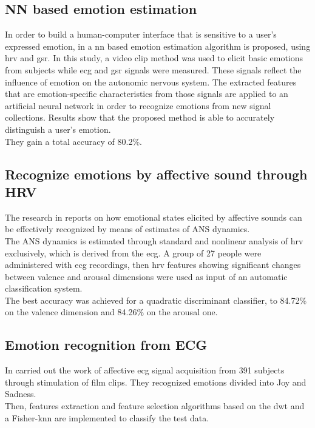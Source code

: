 \subsection{NN based emotion estimation}
In order to build a human-computer interface that is sensitive to a user's expressed emotion, in \cite{yoo2005neural} a \gls{nn} based emotion estimation algorithm is proposed, using \gls{hrv} and \gls{gsr}. In this study, a video clip method was used to elicit basic emotions from subjects while \gls{ecg} and \gls{gsr} signals were measured. These signals reflect the influence of emotion on the autonomic nervous system. The extracted features that are emotion-specific characteristics from those signals are applied to an artificial neural network in order to recognize emotions from new signal collections. Results show that the proposed method is able to accurately distinguish a user's emotion.
\\ They gain a total accuracy of 80.2\%.

\subsection{Recognize emotions by affective sound through HRV}
The research in \cite{nardelli2015recognizing} reports on how emotional states elicited by affective sounds can be effectively recognized by means of estimates of ANS dynamics.
\\ \indent
The ANS dynamics is estimated through standard and nonlinear analysis of \gls{hrv} exclusively, which is derived from the \gls{ecg}. A group of 27 people were administered with \gls{ecg} recordings, then \gls{hrv} features showing significant changes between valence and arousal dimensions were used as input of an automatic classification system.
\\ \indent
The best accuracy was achieved for a quadratic discriminant classifier, to 84.72\% on the valence dimension and 84.26\% on the arousal one. 

\subsection{Emotion recognition from ECG}
In \cite{cai2009research} carried out the work of affective \gls{ecg} signal acquisition from 391 subjects through stimulation of film clips. They recognized emotions divided into Joy and Sadness.
\\
Then, features extraction and feature selection algorithms based on the \gls{dwt} and a Fisher-\gls{knn} are implemented to classify the test data.

